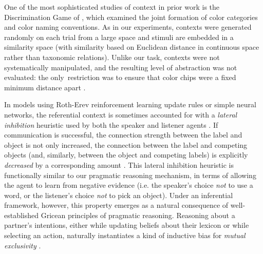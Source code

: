 One of the most sophisticated studies of context in prior work is the Discrimination Game of , which examined the joint formation of color categories and color naming conventions.
As in our experiments, contexts were generated randomly on each trial from a large space and stimuli are embedded in a similarity space (with similarity based on Euclidean distance in continuous space rather than taxonomic relations).
Unlike our task, contexts were not systematically manipulated, and the resulting level of abstraction was not evaluated: the only restriction was to ensure that color chips were a fixed minimum distance apart  \cite<see also>[which found that imposing a realistic Just Noticeable Difference function as the minimum distance on communicative contexts leads to human-like color naming systems]{baronchelli2010modeling}.

In models using Roth-Erev reinforcement learning update rules or simple neural networks, the referential context is sometimes accounted for with a \emph{lateral inhibition} heuristic used by both the speaker and listener agents \cite{franke2012bidirectional}.
If communication is successful, the connection strength between the label and object is not only increased, the connection between the label and competing objects (and, similarly, between the object and competing labels) is explicitly \emph{decreased} by a corresponding amount \cite<see also>{steels2005coordinating}.
This lateral inhibition heuristic is functionally similar to our pragmatic reasoning mechanism, in terms of allowing the agent to learn from negative evidence (i.e. the speaker's choice \emph{not} to use a word, or the listener's choice \emph{not} to pick an object). 
Under an inferential framework, however, this property emerges as a natural consequence of well-established Gricean principles of pragmatic reasoning.
Reasoning about a partner's intentions, either while updating beliefs about their lexicon or while selecting an action, naturally instantiates a kind of inductive bias for \emph{mutual exclusivity} \cite{gulordava2020one,ohmerreinforcement,FrankGoodmanTenenbaum09_Wurwur}.

